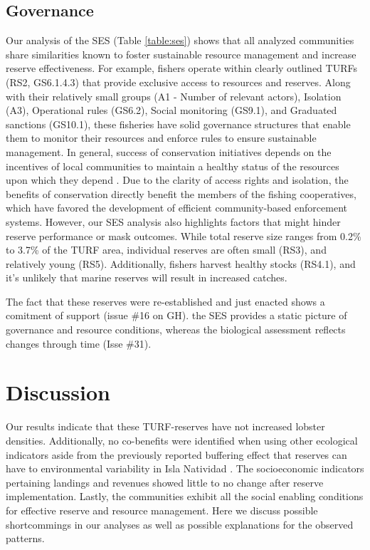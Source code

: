 \documentclass{frontiersSCNS}
\begin{document}
\hypertarget{governance}{%
\subsection{Governance}\label{governance}}

Our analysis of the SES (Table \ref{table:ses}) shows that all analyzed
communities share similarities known to foster sustainable resource
management and increase reserve effectiveness. For example, fishers
operate within clearly outlined TURFs (RS2, GS6.1.4.3) that provide
exclusive access to resources and reserves. Along with their relatively
small groups (A1 - Number of relevant actors), Isolation (A3),
Operational rules (GS6.2), Social monitoring (GS9.1), and Graduated
sanctions (GS10.1), these fisheries have solid governance structures
that enable them to monitor their resources and enforce rules to ensure
sustainable management. In general, success of conservation initiatives
depends on the incentives of local communities to maintain a healthy
status of the resources upon which they depend \citep{jupiter_2017}. Due
to the clarity of access rights and isolation, the benefits of
conservation directly benefit the members of the fishing cooperatives,
which have favored the development of efficient community-based
enforcement systems. However, our SES analysis also highlights factors
that might hinder reserve performance or mask outcomes. While total
reserve size ranges from 0.2\% to 3.7\% of the TURF area, individual
reserves are often small (RS3), and relatively young (RS5).
Additionally, fishers harvest healthy stocks (RS4.1), and it's unlikely
that marine reserves will result in increased catches.

The fact that these reserves were re-established and just enacted shows
a comitment of support (issue \#16 on GH). the SES provides a static
picture of governance and resource conditions, whereas the biological
assessment reflects changes through time (Isse \#31).

\hypertarget{discussion}{%
\section{Discussion}\label{discussion}}

Our results indicate that these TURF-reserves have not increased lobster
densities. Additionally, no co-benefits were identified when using other
ecological indicators aside from the previously reported buffering
effect that reserves can have to environmental variability in Isla
Natividad \citep{micheli_2012-EU}. The socioeconomic indicators
pertaining landings and revenues showed little to no change after
reserve implementation. Lastly, the communities exhibit all the social
enabling conditions for effective reserve and resource management. Here
we discuss possible shortcommings in our analyses as well as possible
explanations for the observed patterns.
\end{document}

